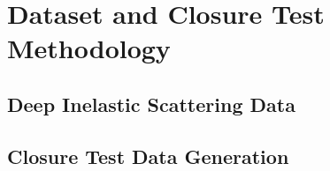 \appendix
\section{Dataset and Closure Test Methodology}
\label{app:dataset}

\subsection*{Deep Inelastic Scattering Data}



\subsection*{Closure Test Data Generation}

